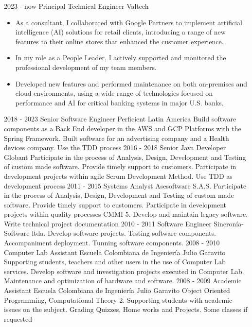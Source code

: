 \documentclass[icon]{twentysecondcv}
\begin{document}
\begin{twenty}
\twentyitem
    {2023 - now}
    {Principal Technical Engineer}
    {Valtech}
    {\begin{itemize}
	\item As a consultant, I collaborated with Google Partners to implement artificial intelligence (AI) solutions for retail clients, introducing a range of new features to their online stores that enhanced the customer experience.
	\item In my role as a People Leader, I actively supported and monitored the professional development of my team members.
	\item Developed new features and performed maintenance on both on-premises and cloud environments, using a wide range of technologies focused on performance and AI for critical banking systems in major U.S. banks.
	\end{itemize}}
\twentyitem
    {2018 - 2023}
    {Senior Software Engineer}
    {Perficient Latin America}
    {Build software components as a Back End developer in the AWS and GCP Platforms with the Spring Framework. Built software for an advertising company and a Health devices company. Use the TDD process}
\twentyitem
    {2016 - 2018}
    {Senior Java Developer}
    {Globant}
    {Participate in the process of Analysis, Design, Development and Testing of custom made software. Provide timely support to customers. Participate in development projects within agile Scrum Development Method. Use TDD as development process}
  \twentyitem
    {2011 - 2015}
    {Systems Analyst}
    {Asesoftware S.A.S.}
    {Participate in the process of Analysis, Design, Development and Testing of custom made software. Provide timely support to customers. Participate in development projects within quality processes CMMI 5. Develop and maintain legacy software. Write technical project documentation}
  \twentyitem
    {2010 - 2011}
    {Software Engineer}
    {Sincron\'ia-Software ltda.}
    {Develop software projects. Testing software components. Accompaniment deployment. Tunning software components.}
\twentyitem
    {2008 - 2010}
    {Computer Lab Assistant}
    {Escuela Colombiana de Ingenier\'ia  Julio Garavito}
    {Supporting students, teachers and other users in the use of Computer Lab services. Develop software and investigation projects executed in Computer Lab. Maintenance and optimization of hardware and software.}
\twentyitem
    {2008 - 2009}
    {Academic Assistant}
    {Escuela Colombiana de Ingenier\'ia  Julio Garavito}
    {Object Oriented Programming, Computational Theory 2. Supporting students with academic issues on the subject. Grading Quizzes, Home works and Projects. Some classes if requested}

\end{twenty}
\end{document}
